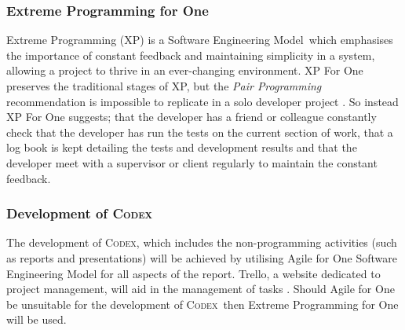 \documentclass[review]{cmpreport}
\newcommand{\sem}{Software Engineering Model}
\newcommand{\Codex}{\textsc{Codex}}
\begin{document}
	\subsubsection{Extreme Programming for One}
	Extreme Programming (XP) is a \sem \ which emphasises the importance of constant feedback and maintaining simplicity in a system, allowing a project to thrive in an ever-changing environment. XP For One preserves the traditional stages of XP, but the \emph{Pair Programming} recommendation is impossible to replicate in a solo developer project \citep{SoloXP}. So instead XP For One suggests; that the developer has a friend or colleague constantly check that the developer has run the tests on the current section of work, that a log book is kept detailing the tests and development results and that the developer meet with a supervisor or client regularly to maintain the constant feedback. 
	
	\subsubsection{Development of \Codex}
	The development of \Codex, which includes the non-programming activities (such as reports and presentations) will be achieved by utilising Agile for One Software Engineering Model for all aspects of the report. Trello, a website dedicated to project management, will aid in the management of tasks \citep{Trello}. Should Agile for One be unsuitable for the development of \Codex \ then Extreme Programming for One will be used.
	
	\clearpage 
	
\end{document}
